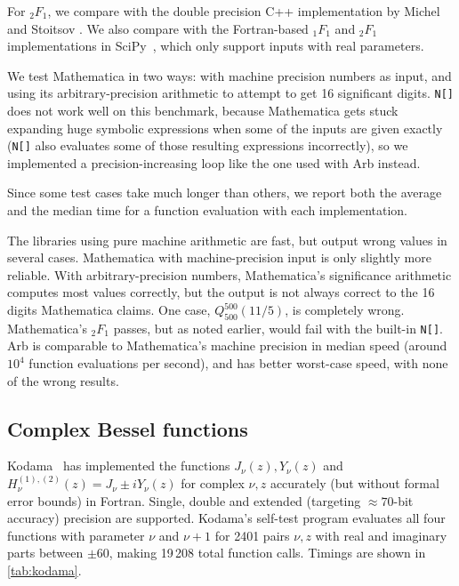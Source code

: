 \documentclass[11pt]{article}
\begin{document}
For ${}_2F_1$, we compare with the double precision C++ implementation
by Michel and Stoitsov \cite{michel2008fast}.
We also compare with the Fortran-based ${}_1F_1$ and ${}_2F_1$ implementations in
SciPy~\cite{scipy}, which only support inputs with real parameters.

We test Mathematica in two ways: with machine precision numbers as input,
and using its arbitrary-precision arithmetic to attempt to get 16 significant digits.
\texttt{N[]} does not work well
on this benchmark, because Mathematica gets stuck expanding huge symbolic
expressions when some of the inputs are given exactly (\texttt{N[]}
also evaluates some of those resulting expressions incorrectly),
so we implemented a precision-increasing loop like the one used
with Arb instead.

Since some test cases take much longer than others,
we report both the average and the median time for a function
evaluation with each implementation.

The libraries using pure machine arithmetic are fast, but
output wrong values in several cases.
Mathematica with machine-precision input is only slightly more reliable.
With arbitrary-precision numbers, Mathematica's significance arithmetic
computes most values correctly, but the output is not always correct
to the 16 digits Mathematica claims. One case,
$Q_{500}^{500}(11/5)$, is completely wrong.
Mathematica's ${}_2F_1$ passes,
but as noted earlier, would fail with the built-in \texttt{N[]}.
Arb is comparable to Mathematica's machine precision in
median speed (around $10^4$ function evaluations per second),
and has better worst-case speed,
with none of the wrong results.

\subsection{Complex Bessel functions}

Kodama~\cite{Kodama2011} has implemented the functions $J_{\nu}(z), Y_{\nu}(z)$ and
$H^{(1),(2)}_{\nu}(z) = J_{\nu} \pm i Y_{\nu}(z)$ for complex $\nu, z$
accurately (but without formal error bounds) in Fortran.
Single, double and extended (targeting $\approx 70$-bit accuracy) precision are supported.
Kodama's self-test program evaluates all four functions
with parameter $\nu$ and $\nu + 1$ for 2401 pairs $\nu,z$ with real
and imaginary parts between $\pm 60$, making
19\,208 total function calls. Timings are shown in \cref{tab:kodama}.
\end{document}

